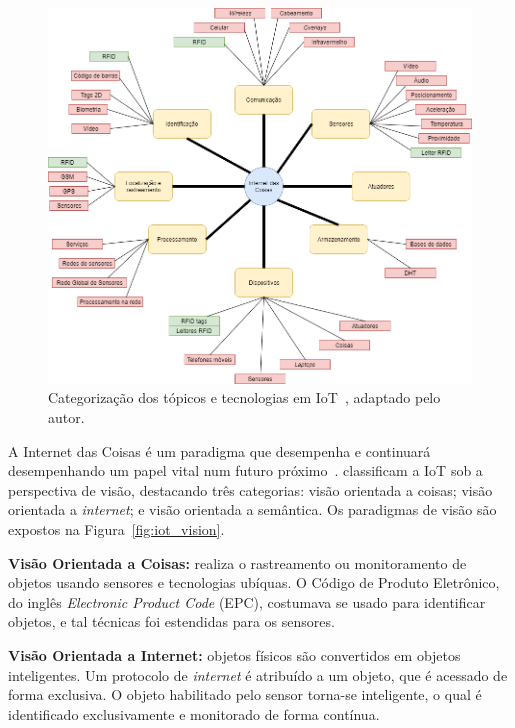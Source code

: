 \begin{figure}[ht]
\centering
\includegraphics[width=1\textwidth]{imagens/iot_diagram.png}
\caption{Categorização dos tópicos e tecnologias em IoT~\cite{mayer2009security}, adaptado pelo autor.
\label{fig:iot_diag}}
\end{figure}
\FloatBarrier

A Internet das Coisas é um paradigma que desempenha e continuará desempenhando um papel vital num futuro próximo~\cite{sankarinternet}. \citeauthor{sankarinternet} classificam a IoT sob a perspectiva de visão, destacando três categorias: visão orientada a coisas; visão orientada a \textit{internet}; e visão orientada a semântica. Os paradigmas de visão são expostos na Figura~\ref{fig:iot_vision}.

\textbf{Visão Orientada a Coisas:} realiza o rastreamento ou monitoramento de objetos usando sensores e tecnologias ubíquas. O Código de Produto Eletrônico, do inglês \textit{Electronic Product Code} (EPC), costumava se usado para identificar objetos, e tal técnicas foi estendidas para os sensores.

\textbf{Visão Orientada a Internet:} objetos físicos são convertidos em objetos inteligentes. Um protocolo de \textit{internet} é atribuído a um objeto, que é acessado de forma exclusiva. O objeto habilitado pelo sensor torna-se inteligente, o qual é identificado exclusivamente e monitorado de forma contínua.

